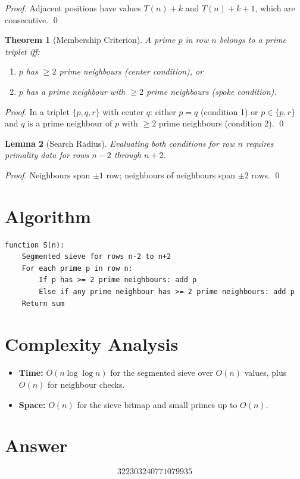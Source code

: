 \documentclass[12pt]{article}
\newtheorem{theorem}{Theorem}
\newtheorem{lemma}[theorem]{Lemma}
\begin{document}
\begin{proof}
Adjacent positions have values $T(n)+k$ and $T(n)+k+1$, which are consecutive. \qed
\end{proof}

\begin{theorem}[Membership Criterion]
A prime $p$ in row $n$ belongs to a prime triplet iff:
\begin{enumerate}
    \item $p$ has $\geq 2$ prime neighbours (center condition), or
    \item $p$ has a prime neighbour with $\geq 2$ prime neighbours (spoke condition).
\end{enumerate}
\end{theorem}

\begin{proof}
In a triplet $\{p, q, r\}$ with center $q$: either $p = q$ (condition 1) or $p \in \{p, r\}$ and $q$ is a prime neighbour of $p$ with $\geq 2$ prime neighbours (condition 2). \qed
\end{proof}

\begin{lemma}[Search Radius]
Evaluating both conditions for row $n$ requires primality data for rows $n-2$ through $n+2$.
\end{lemma}

\begin{proof}
Neighbours span $\pm 1$ row; neighbours of neighbours span $\pm 2$ rows. \qed
\end{proof}

\section{Algorithm}

\begin{verbatim}
function S(n):
    Segmented sieve for rows n-2 to n+2
    For each prime p in row n:
        If p has >= 2 prime neighbours: add p
        Else if any prime neighbour has >= 2 prime neighbours: add p
    Return sum
\end{verbatim}

\section{Complexity Analysis}

\begin{itemize}
    \item \textbf{Time:} $O(n \log\log n)$ for the segmented sieve over $O(n)$ values, plus $O(n)$ for neighbour checks.
    \item \textbf{Space:} $O(n)$ for the sieve bitmap and small primes up to $O(n)$.
\end{itemize}

\section{Answer}

\[
\boxed{322303240771079935}
\]
\end{document}
